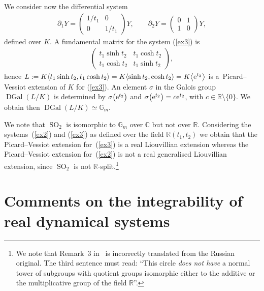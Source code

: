\documentclass[pdftex]{sigma}%
\numberwithin{equation}{section}
\newcommand{\G}{\mathbb{G}}
\newcommand{\R}{\mathbb{R}}
\newcommand{\C}{\mathbb{C}}
\def \DGal{\operatorname{DGal}}
\def \SO{\operatorname{SO}}
\begin{document}
\begin{Example}
We consider now the differential system
\begin{gather}\label{ex3}
\partial_1 Y= \begin{pmatrix} 1/t_1 & 0 \\ 0 & 1/t_1 \end{pmatrix} Y,\qquad
\partial_2 Y= \begin{pmatrix} 0&1 \\ 1 &0 \end{pmatrix} Y,
\end{gather}
defined over $K$. A fundamental matrix for the system (\ref{ex3}) is
\begin{gather*}
\begin{pmatrix} t_1 \sinh t_2 & t_1 \cosh t_2 \\ t_1 \cosh t_2 & t_1 \sinh t_2 \end{pmatrix}\!,
\end{gather*}
hence $L:=K\langle t_1 \sinh t_2,t_1 \cosh t_2 \rangle=K\langle \sinh t_2, \cosh t_2 \rangle=K\big\langle {\rm e}^{t_2} \big\rangle$ is a~Picard--Vessiot extension of $K$ for (\ref{ex3}).
An element $\sigma$ in the Galois group $\DGal(L/K)$ is determined by $\sigma\big({\rm e}^{t_2}\big)$ and $\sigma\big({\rm e}^{t_2}\big)=c {\rm e}^{t_2}$, with $c \in \R\setminus \{0\}$. We obtain then $\DGal(L/K) \simeq \G_m$.

We note that $\SO_2$ is isomorphic to $\G_m$ over $\C$ but not over $\R$. Considering the systems~(\ref{ex2}) and (\ref{ex3}) as defined over the field $\R(t_1,t_2)$ we obtain that the Picard--Vessiot extension for~(\ref{ex3}) is a real Liouvillian extension whereas the Picard--Vessiot extension for~(\ref{ex2}) is not a real gene\-ralised Liouvillian extension, since $\SO_2$ is not $\R$-split.\footnote{We note that Remark~3 in~\cite{GK} is incorrectly translated from the Russian original. The third sentence must read: ``This circle {\it does not have} a normal tower of subgroups with quotient groups isomorphic either to the additive or the multiplicative group of the field $\R$''.}
\end{Example}
\section{Comments on the integrability of real dynamical systems}
\end{document}
